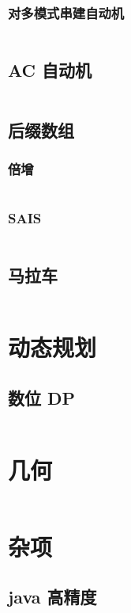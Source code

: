 \documentclass[a4paper, twoside]{article}
\begin{document}
\begin{multicols}{2}
				\subsubsection{对多模式串建自动机}
					\inputminted{cpp}{../src-midori/string/广义后缀自动机-多模式串.cpp}
				
			\subsection{AC 自动机}
				\inputminted{cpp}{../src-midori/string/AC自动机.cpp}
			
			\subsection{后缀数组}
				\subsubsection{倍增}
					\inputminted{cpp}{../src-midori/string/SA.cpp}

				\subsubsection{SAIS}
					\inputminted{cpp}{../src-midori/string/SAIS.cpp}
			
			\subsection{马拉车}
				\inputminted{cpp}{../src-midori/string/manacher.cpp}
		
		\newpage
		\section{动态规划}
			\subsection{数位 DP}
				\inputminted{cpp}{../src-midori/dp/数位dp.cpp}
		
		\newpage
		\section{几何}
			\inputminted{cpp}{../src-midori/geometry/geo-jry.cpp}
		
		\newpage
		\section{杂项}
			\subsection{java 高精度}
				\inputminted{java}{../src-midori/other/高精度.java}

\end{multicols}
\end{document}
